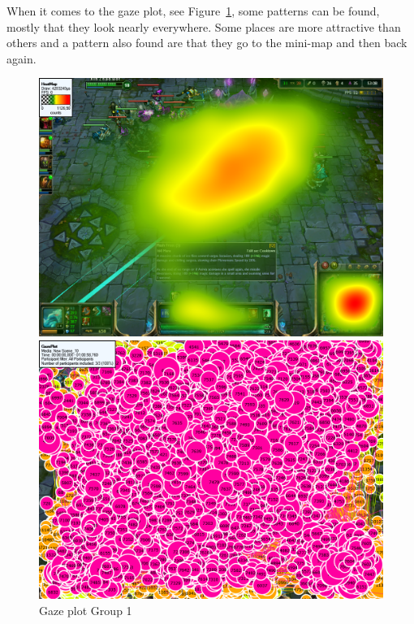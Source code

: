 \documentclass[notitlepage]{report}
\begin{document}
When it comes to the gaze plot, see Figure~\ref{gaze_noob}, some patterns can be found, mostly that they look nearly everywhere. Some places are more attractive than others and a pattern also found are that they go to the mini-map and then back again.

\begin{figure}[!ht]
\begin{minipage}[b]{0.45\linewidth}
\centering
\includegraphics[width=\textwidth]{images/heatmap/Noobs}
\caption{Heat map Group 1}
\label{heat_noob}
\end{minipage}
\hspace{0.5cm}
\begin{minipage}[b]{0.45\linewidth}
\centering
\includegraphics[width=\textwidth]{images/gazeplot/Noobs}
\caption{Gaze plot Group 1}
\label{gaze_noob}
\end{minipage}
\end{figure}
\end{document}
